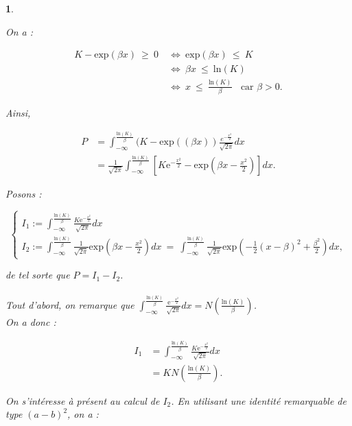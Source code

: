 \documentclass{article}
\theoremstyle{exostyle}
\newtheorem{exercice}{}
\newenvironment{questions}{
\begin{enumerate}[\hspace{12pt} 1.]}{\end{enumerate}}
\begin{document}
\begin{exercice}
\begin{questions}
On a :

\begin{align*}
    K - \text{exp}(\beta x) \ \geq \ 0 \ &\Leftrightarrow \ \text{exp}(\beta x) \  \leq \ K\\
    &\Leftrightarrow \ \beta x \ \leq \ \text{ln}(K)\\
    &\Leftrightarrow \ x \ \leq \ \frac{\text{ln}(K)}{\beta} \ \ \ \ \text{car $\beta > 0$.}
\end{align*}


Ainsi, 

\begin{align*}
    P &= \int_{-\infty}^{\frac{\text{ln}(K)}{\beta}} (K-\text{exp}((\beta x)) \frac{e^{-\frac{x^{2}}{2}}}{\sqrt{2\pi}}dx\\
    &= \frac{1}{\sqrt{2\pi}} \int_{-\infty}^{\frac{\text{ln}(K)}{\beta}} \left[ K \text{e}^{-\frac{x^{2}}{2}} - \text{exp} \left( \beta x - \frac{x^{2}}{2} \right) \right]dx.
\end{align*}


Posons : 

\[\left\{
  \begin{array}{lll}
    I_{1} := \int_{-\infty}^{\frac{\text{ln}(K)}{\beta}} \frac{K \text{e}^{-\frac{x^{2}}{2}}}{\sqrt{2\pi}}dx\\
    I_{2} := \int_{-\infty}^{\frac{\text{ln}(K)}{\beta}} \frac{1}{\sqrt{2\pi}}\text{exp}\left( \beta x - \frac{x^{2}}{2} \right)dx \ = \ \int_{-\infty}^{\frac{\text{ln}(K)}{\beta}} \frac{1}{\sqrt{2\pi}}\text{exp}\left( - \frac{1}{2} (x-\beta)^{2}+\frac{\beta^{2}}{2} \right)dx,
\end{array}
\right.\]

de tel sorte que $P = I_{1} - I_{2}$.\\
\\

Tout d'abord, on remarque que $\int_{-\infty}^{\frac{\text{ln}(K)}{\beta}} \frac{ \text{e}^{-\frac{x^{2}}{2}}}{\sqrt{2\pi}}dx = N \left( \frac{\text{ln}(K)}{\beta} \right)$.\\
On a donc : 

\begin{align*}
    I_{1} &= \int_{-\infty}^{\frac{\text{ln}(K)}{\beta}} \frac{K \text{e}^{-\frac{x^{2}}{2}}}{\sqrt{2\pi}}dx\\
    &= KN \left( \frac{\text{ln}(K)}{\beta} \right).
\end{align*}

\bigbreak
\bigbreak

On s'intéresse à présent au calcul de $I_{2}$.
En utilisant une identité remarquable de type $(a-b)^{2}$, on a :


\end{questions}
\end{exercice}
\end{document}
